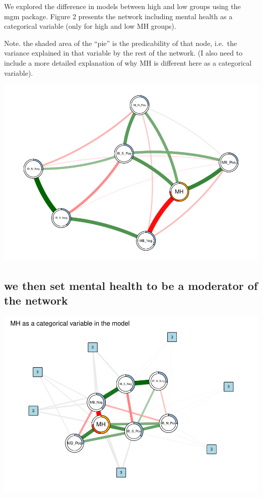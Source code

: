 \documentclass[man,floatsintext]{apa6}
\begin{document}
We explored the difference in models between high and low groups using the mgm package. Figure 2 presents the network including mental health as a categorical variable (only for high and low MH groups).

Note. the shaded area of the \enquote{pie} is the predicability of that node, i.e.~the variance explained in that variable by the rest of the network. (I also need to include a more detailed explanation of why MH is different here as a categorical variable).

\includegraphics{script_files/figure-latex/mgm-1.pdf}

\hypertarget{we-then-set-mental-health-to-be-a-moderator-of-the-network}{%
\subsection{we then set mental health to be a moderator of the network}\label{we-then-set-mental-health-to-be-a-moderator-of-the-network}}

\includegraphics{script_files/figure-latex/unnamed-chunk-3-1.pdf}
\end{document}
